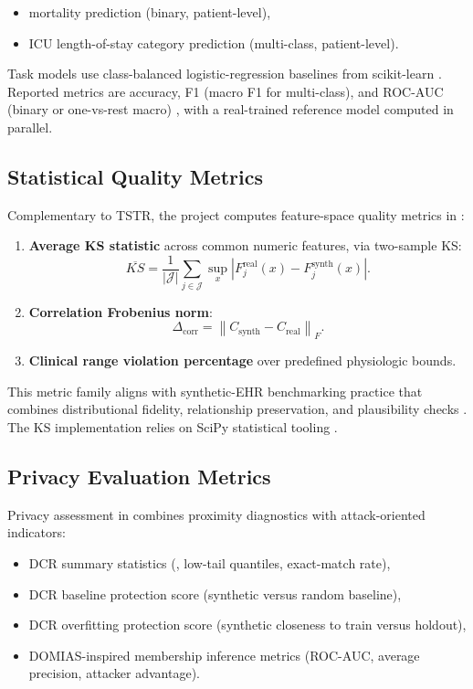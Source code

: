 \begin{itemize}\tightlist
    \item mortality prediction (binary, patient-level),
    \item ICU length-of-stay category prediction (multi-class, patient-level).
\end{itemize}

Task models use class-balanced logistic-regression baselines from scikit-learn \cite{pedregosa2011scikit}. Reported metrics are accuracy, F1 (macro F1 for multi-class), and ROC-AUC (binary or one-vs-rest macro) \cite{fawcett2006roc}, with a real-trained reference model computed in parallel.

\subsection{Statistical Quality Metrics}

Complementary to TSTR, the project computes feature-space quality metrics in :
\begin{enumerate}\tightlist
    \item \textbf{Average KS statistic} across common numeric features, via two-sample KS:
    \begin{equation}
    \overline{KS} = \frac{1}{|\mathcal{J}|}\sum_{j\in\mathcal{J}}\sup_x\left|F^{\text{real}}_j(x)-F^{\text{synth}}_j(x)\right|.
    \end{equation}
    \item \textbf{Correlation Frobenius norm}:
    \begin{equation}
    \Delta_{\text{corr}} = \left\|C_{\text{synth}} - C_{\text{real}}\right\|_{F}.
    \end{equation}
    \item \textbf{Clinical range violation percentage} over predefined physiologic bounds.
\end{enumerate}

This metric family aligns with synthetic-EHR benchmarking practice that combines distributional fidelity, relationship preservation, and plausibility checks \cite{yan2022benchmarking,kaabachi2025scoping}. The KS implementation relies on SciPy statistical tooling \cite{virtanen2020scipy}.

\subsection{Privacy Evaluation Metrics}

Privacy assessment in  combines proximity diagnostics with attack-oriented indicators:
\begin{itemize}\tightlist
    \item DCR summary statistics (, low-tail quantiles, exact-match rate),
    \item DCR baseline protection score (synthetic versus random baseline),
    \item DCR overfitting protection score (synthetic closeness to train versus holdout),
    \item DOMIAS-inspired membership inference metrics (ROC-AUC, average precision, attacker advantage).
\end{itemize}

